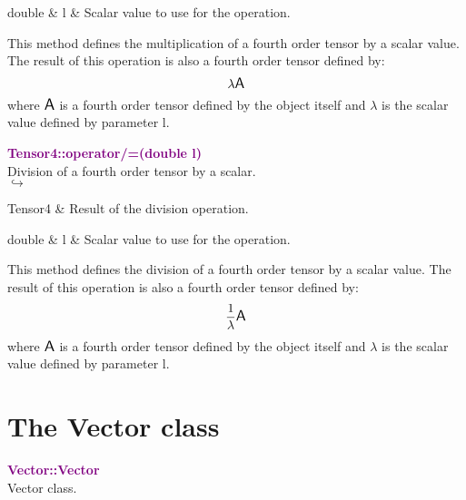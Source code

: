 \begin{tcolorbox}[width=\textwidth,myArgs,tabularx={ll|R}]
double & l & Scalar value to use for the operation.
\end{tcolorbox}

This method defines the multiplication of a fourth order tensor by a scalar value.
The result of this operation is also a fourth order tensor defined by:
\begin{equation*}
\lambda \mbox{\large\ensuremath{\mathsf{A}}}
\end{equation*}
where $\mbox{\large\ensuremath{\mathsf{A}}}$ is a fourth order tensor defined by the object itself and $\lambda$ is the scalar value defined by parameter l.

\textcolor{purple}{\textbf{Tensor4::operator/=(double l)}}\label{Tensor4::operator/=(double l)}\\
Division of a fourth order tensor by a scalar.\\ \hspace*{5mm}$\hookrightarrow$
\vspace*{-2em}\begin{tcolorbox}[grow to left by=-1cm, width=\textwidth-1cm,myArgs,tabularx={l|R}]
Tensor4 & Result of the division operation.
\end{tcolorbox}

\begin{tcolorbox}[width=\textwidth,myArgs,tabularx={ll|R}]
double & l & Scalar value to use for the operation.
\end{tcolorbox}

This method defines the division of a fourth order tensor by a scalar value.
The result of this operation is also a fourth order tensor defined by:
\begin{equation*}
\frac{1}{\lambda} \mbox{\large\ensuremath{\mathsf{A}}}
\end{equation*}
where $\mbox{\large\ensuremath{\mathsf{A}}}$ is a fourth order tensor defined by the object itself and $\lambda$ is the scalar value defined by parameter l.

\section{The Vector class}

\textcolor{purple}{\textbf{Vector::Vector}}\label{Vector::Vector}\\
Vector class.

